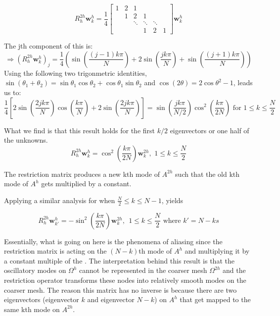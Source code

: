\documentclass[pdftex,12pt,a4paper]{article}
\begin{document}
\begin{equation}
R_h^{2h} \mathbf{w}_k^h = \frac 1 4 \begin{bmatrix}1 & 2 & 1 \\ & 1 & 2 & 1 \\ & & \ddots & \ddots & \ddots \\ & & & 1 & 2 & 1 \end{bmatrix} \mathbf{w}_k^h  
\end{equation}

The jth component of this is:  
\begin{equation}
\Rightarrow \left( R_h^{2h} \mathbf{w}_k^h \right)_j = 
\frac 1 4 \left(\sin\left(\frac{(j-1)k \pi}{N} \right) + 2 \sin\left(\frac{jk \pi}{N} \right)  + \sin\left(\frac{(j+1) k \pi}{N} \right)  \right)
\end{equation}
Using the following two trigonmetric identities, $\sin(\theta_1 + \theta_2) = \sin \theta_1 \cos\theta_2 + \cos\theta_1\sin\theta_2$ and $\cos(2 \theta) = 2 \cos \theta^2 -1$, leads us to: 
$$
\frac 1 4 \left[ 2 \sin\left(\frac{2jk\pi}{N} \right) \cos\left( \frac{k\pi}{N}\right)  + 2 \sin \left( \frac{2jk \pi}{N} \right) \right] =  \sin \left( \frac{jk \pi }{N / 2}\right) \cos^2 \left( \frac{k \pi}{2N} \right) \text{ for } 1 \leq k \leq \frac N 2 $$

What we find is that this result holds for the first $k/2$ eigenvectors or one half of the unknowns.  
\begin{equation}
R_h^{2h} \mathbf{w}_k^h = \cos^2 \left( \frac{k \pi}{2N}\right) \mathbf{w}_k^{2h}, \, \,  1 \leq k \leq \frac N 2 
\end{equation}

The restriction matrix produces a new kth mode of $A^{2h}$ such that the old kth mode of $A^h$ gets multiplied by a constant.  

Applying a similar analysis for when $ \frac N 2 \leq k \leq N -1$, yields

$$
R_h^{2h} \mathbf{w}_{k'}^h = - \sin^2 \left( \frac{k \pi}{2N} \right) \mathbf{w}_k^{2h}, ~~ 1 \leq k \leq \frac N 2 \text{ where } k' = N-ks
$$ 

Essentially, what is going on here is the phenomena of aliasing since the restriction matrix is acting on the $(N-k)$th mode of $A^h$ and multiplying it by a constant multiple of the .  The interpretation behind this result is that the oscillatory modes on $\Omega^h$ cannot be represented in the coarser mesh $\Omega^{2h}$ and the restriction operator transforms these nodes into relatively smooth modes on the coarser mesh.  The reason this matrix has no inverse is because there are two eigenvectors (eigenvector $k$ and eigenvector $N-k$) on $A^h$ that get mapped to the same kth mode on $A^{2h}$.
\end{document}
